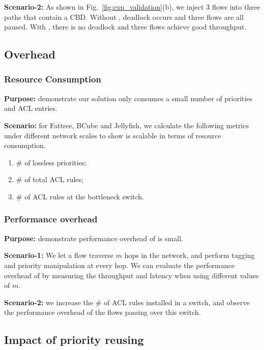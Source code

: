 \textbf{Scenario-2:} As shown in Fig.~\ref{fig:exp_validation}(b), we inject 3 flows into three paths that contain a CBD. Without \sysname{}, deadlock occurs and three flows are all paused. With \sysname{}, there is no deadlock and three flows achieve good throughput.

\subsection{Overhead}\label{subsec:exp_overhead}

\subsubsection{Resource Consumption}\label{subsec:exp_resourceconsump}

\textbf{Purpose:} demonstrate our solution only consumes a small number of priorities and ACL entries.

\textbf{Scenario:} for Fattree, BCube and Jellyfish, we calculate the following metrics under different network scales to show \sysname{} is scalable in terms of resource consumption.
\begin{enumerate}
	\item $\#$ of lossless priorities;
	\item $\#$ of total ACL rules;
 	\item $\#$ of ACL rules at the bottleneck switch.
\end{enumerate}

\subsubsection{Performance overhead}\label{subsec:exp_performanceoverhead}

 \textbf{Purpose:} demonstrate performance overhead of \sysname{} is small.

\textbf{Scenario-1:} We let a flow traverse $m$ hops in the network, and perform tagging and priority manipulation at every hop. We can evaluate the performance overhead of \sysname{} by measuring the throughput and latency when using different values of $m$.

\textbf{Scenario-2:} we increase the $\#$ of ACL rules installed in a switch, and observe the performance overhead of the flows passing over this switch.

\subsection{Impact of priority reusing}\label{subsec:exp_priorityreusing}


